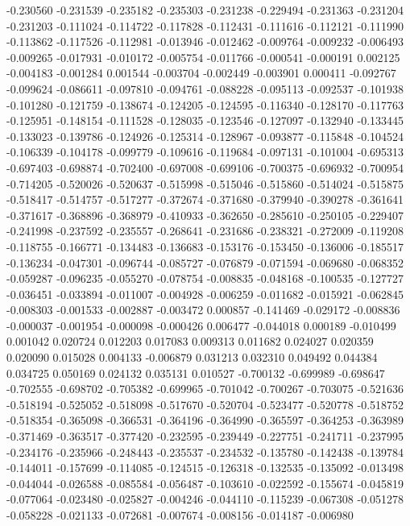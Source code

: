 -0.230560
-0.231539
-0.235182
-0.235303
-0.231238
-0.229494
-0.231363
-0.231204
-0.231203
-0.111024
-0.114722
-0.117828
-0.112431
-0.111616
-0.112121
-0.111990
-0.113862
-0.117526
-0.112981
-0.013946
-0.012462
-0.009764
-0.009232
-0.006493
-0.009265
-0.017931
-0.010172
-0.005754
-0.011766
-0.000541
-0.000191
0.002125
-0.004183
-0.001284
0.001544
-0.003704
-0.002449
-0.003901
0.000411
-0.092767
-0.099624
-0.086611
-0.097810
-0.094761
-0.088228
-0.095113
-0.092537
-0.101938
-0.101280
-0.121759
-0.138674
-0.124205
-0.124595
-0.116340
-0.128170
-0.117763
-0.125951
-0.148154
-0.111528
-0.128035
-0.123546
-0.127097
-0.132940
-0.133445
-0.133023
-0.139786
-0.124926
-0.125314
-0.128967
-0.093877
-0.115848
-0.104524
-0.106339
-0.104178
-0.099779
-0.109616
-0.119684
-0.097131
-0.101004
-0.695313
-0.697403
-0.698874
-0.702400
-0.697008
-0.699106
-0.700375
-0.696932
-0.700954
-0.714205
-0.520026
-0.520637
-0.515998
-0.515046
-0.515860
-0.514024
-0.515875
-0.518417
-0.514757
-0.517277
-0.372674
-0.371680
-0.379940
-0.390278
-0.361641
-0.371617
-0.368896
-0.368979
-0.410933
-0.362650
-0.285610
-0.250105
-0.229407
-0.241998
-0.237592
-0.235557
-0.268641
-0.231686
-0.238321
-0.272009
-0.119208
-0.118755
-0.166771
-0.134483
-0.136683
-0.153176
-0.153450
-0.136006
-0.185517
-0.136234
-0.047301
-0.096744
-0.085727
-0.076879
-0.071594
-0.069680
-0.068352
-0.059287
-0.096235
-0.055270
-0.078754
-0.008835
-0.048168
-0.100535
-0.127727
-0.036451
-0.033894
-0.011007
-0.004928
-0.006259
-0.011682
-0.015921
-0.062845
-0.008303
-0.001533
-0.002887
-0.003472
0.000857
-0.141469
-0.029172
-0.008836
-0.000037
-0.001954
-0.000098
-0.000426
0.006477
-0.044018
0.000189
-0.010499
0.001042
0.020724
0.012203
0.017083
0.009313
0.011682
0.024027
0.020359
0.020090
0.015028
0.004133
-0.006879
0.031213
0.032310
0.049492
0.044384
0.034725
0.050169
0.024132
0.035131
0.010527
-0.700132
-0.699989
-0.698647
-0.702555
-0.698702
-0.705382
-0.699965
-0.701042
-0.700267
-0.703075
-0.521636
-0.518194
-0.525052
-0.518098
-0.517670
-0.520704
-0.523477
-0.520778
-0.518752
-0.518354
-0.365098
-0.366531
-0.364196
-0.364990
-0.365597
-0.364253
-0.363989
-0.371469
-0.363517
-0.377420
-0.232595
-0.239449
-0.227751
-0.241711
-0.237995
-0.234176
-0.235966
-0.248443
-0.235537
-0.234532
-0.135780
-0.142438
-0.139784
-0.144011
-0.157699
-0.114085
-0.124515
-0.126318
-0.132535
-0.135092
-0.013498
-0.044044
-0.026588
-0.085584
-0.056487
-0.103610
-0.022592
-0.155674
-0.045819
-0.077064
-0.023480
-0.025827
-0.004246
-0.044110
-0.115239
-0.067308
-0.051278
-0.058228
-0.021133
-0.072681
-0.007674
-0.008156
-0.014187
-0.006980
